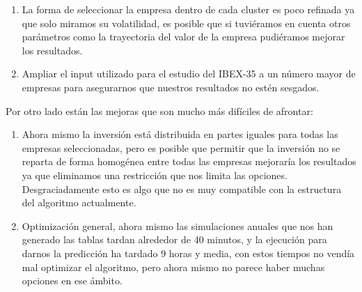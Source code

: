 \documentclass[12pt,a4paper]{article}
\begin{document}
	
	\begin{enumerate}
			\item La forma de seleccionar la empresa dentro de cada cluster es poco refinada ya que solo miramos su volatilidad, es posible que si tuviéramos en cuenta otros parámetros como la trayectoria del valor de la empresa pudiéramos mejorar los resultados.
			\item Ampliar el input utilizado para el estudio del IBEX-35 a un número mayor de empresas para asegurarnos que nuestros resultados no estén sesgados.
	\end{enumerate}	
	Por otro lado están las mejoras que son mucho más difíciles de afrontar:\\
	\begin{enumerate}
			\item Ahora mismo la inversión está distribuida en partes iguales para todas las empresas seleccionadas, pero es posible que permitir que la inversión no se reparta de forma homogénea entre todas las empresas mejoraría los resultados ya que eliminamos una restricción que nos limita las opciones. Desgraciadamente esto es algo que no es muy compatible con la estructura del algoritmo actualmente.
			\item Optimización general, ahora mismo las simulaciones anuales que nos han generado las tablas tardan alrededor de 40 minutos, y la ejecución para darnos la predicción ha tardado 9 horas y media, con estos tiempos no vendía mal optimizar el algoritmo, pero ahora mismo no parece haber muchas opciones en ese ámbito.
	\end{enumerate}	
\pagebreak
\end{document}
